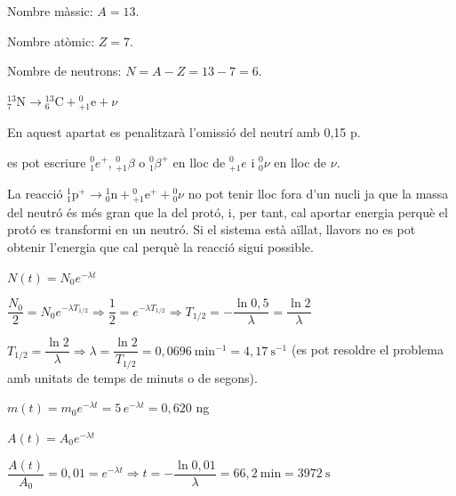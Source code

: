 \begin{solapartat}
 Nombre màssic: $A = 13$.

 Nombre atòmic: $Z = 7$.

 Nombre de neutrons: $N = A - Z = 13 - 7 = 6$.

 $^{13}_{7}\mathrm{N} \to {}^{13}_{6}\mathrm{C} + {}^{0}_{+1}\mathrm{e} + \nu$

En aquest apartat es penalitzarà l'omissió del neutrí amb 0,15 p.

 es pot escriure ${}^{0}_{1}e^+$, ${}^{0}_{+1}\beta$ o
${}^{0}_{1}\beta^+$ en lloc de ${}^{0}_{+1}e$ i ${}^{0}_{0}\nu$ en lloc de $\nu$.

 La reacció ${}^{1}_{1}\mathrm{p}^+ \to {}^{1}_{0}\mathrm{n} + {}^{0}_{+1}\mathrm{e}^+ + {}^{0}_{0}\nu$
no pot tenir lloc fora d'un nucli ja que la massa del neutró és més gran que la del protó,
i, per tant, cal aportar energia perquè el protó es transformi en un neutró. Si el sistema
està aïllat, llavors no es pot obtenir l'energia que cal perquè la reacció sigui possible.
\end{solapartat}

\begin{solapartat}
$N(t) = N_0 e^{-\lambda t}$

 $\dfrac{N_0}{2} = N_0 e^{-\lambda T_{1/2}} \Rightarrow \dfrac{1}{2} = e^{-\lambda T_{1/2}} \Rightarrow T_{1/2} = -\dfrac{\ln 0,5}{\lambda} = \dfrac{\ln 2}{\lambda}$

 $T_{1/2} = \dfrac{\ln 2}{\lambda} \Rightarrow \lambda = \dfrac{\ln 2}{T_{1/2}} = 0,0696\ \mathrm{min^{-1}} = 4,17\ \mathrm{s^{-1}}$ (es pot resoldre el problema
amb unitats de temps de minuts o de segons).

 $m(t) = m_0 e^{-\lambda t} = 5\,e^{-\lambda t} = 0,620$ ng

 $A(t) = A_0 e^{-\lambda t}$

 $\dfrac{A(t)}{A_0} = 0,01 = e^{-\lambda t} \Rightarrow t = -\dfrac{\ln 0,01}{\lambda} = 66,2\ \mathrm{min} = 3972\ \mathrm{s}$
\end{solapartat}
